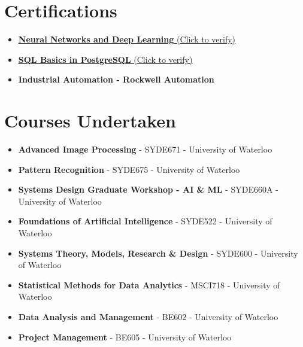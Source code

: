 \documentclass{ExpressiveResume}
\begin{document}

\section{Certifications}
\begin{itemize}
\item {\href{https://www.coursera.org/account/accomplishments/verify/ZRBWP4ZFF8YX}{\textbf{Neural Networks and Deep Learning} (Click to verify)}}
\item {\href{https://learnsql.com/files/course-certificate/dcQdkgNWcDbdVjeWXGwKXFTHqxkLQXbYCCJYexdB}{\textbf{SQL Basics in PostgreSQL} (Click to verify)}}
\item {\textbf{Industrial Automation - Rockwell Automation}}
\newline

\end{itemize}


\section{Courses Undertaken}
\begin{itemize}
\item {\textbf{Advanced Image Processing} - SYDE671 - University of Waterloo}
\item {\textbf{Pattern Recognition} - SYDE675 - University of Waterloo}
\item {\textbf{Systems Design Graduate Workshop - AI \& ML} - SYDE660A - University of Waterloo}
\item {\textbf{Foundations of Artificial Intelligence} - SYDE522 - University of Waterloo}
\item {\textbf{Systems Theory, Models, Research \& Design} - SYDE600 - University of Waterloo}

\item {\textbf{Statistical Methods for Data Analytics} - MSCI718 - University of Waterloo}
\item {\textbf{Data Analysis and Management} - BE602 - University of Waterloo}
\item {\textbf{Project Management} - BE605 - University of Waterloo}
\end{itemize}
\end{document}
